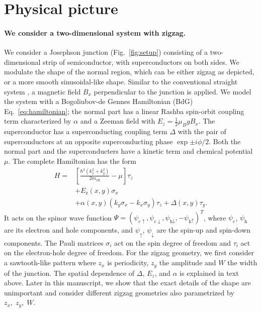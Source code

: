 \documentclass[english, twocolumn, 10pt, aps, superscriptaddress, floatfix, prb, citeautoscript]{revtex4-1}
\newcommand{\kx}{k_x}
\newcommand{\ky}{k_y}
\newcommand{\meff}{m_\text{eff}}
\renewcommand{\comment}[2]{#2}
\renewcommand{\comment}{\paragraph}
\begin{document}
\section{Physical picture}\label{sec:physical_picture}

\comment{We consider a two-dimensional system with zigzag.}
We consider a Josephson junction (Fig.~\ref{fig:setup}) consisting of a two-dimensional strip of semiconductor, with superconductors on both sides.
We modulate the shape of the normal region, which can be either zigzag as depicted, or a more smooth sinusoidal-like shape.
Similar to the conventional straight system \cite{pientka2017topological}, a magnetic field $B_x$ perpendicular to the junction is applied.
We model the system with a Bogoliubov-de Gennes Hamiltonian (BdG) Eq.~\eqref{eq:hamiltonian}; the normal part has a linear Rashba spin-orbit coupling term characterized by $\alpha$ and a Zeeman field with $E_z=\frac{1}{2} \mu_B g B_x$.
The superconductor has a superconducting coupling term $\Delta$ with the pair of superconductors at an opposite superconducting phase $\exp{\pm i \phi/2}$.
Both the normal part and the superconducters have a kinetic term and chemical potential $\mu$.
The complete Hamiltonian has the form
\begin{equation}
\begin{split}
    H = & \left[\frac{\hbar^2\left(\kx^2 + \ky^2\right)}{2\meff} - \mu\right] \tau_z \\
        & + E_\text{z}(x,y) \sigma_x \\
        & + \alpha(x,y) \left( \ky \sigma_x - \kx \sigma_y \right) \tau_z
          + \Delta(x,y) \tau_y.
\end{split}
\label{eq:hamiltonian}
\end{equation}
It acts on the spinor wave function $\Psi={\left(\psi_{e\uparrow},\psi_{e\downarrow},\psi_{\textrm{h}\downarrow},-\psi_{\textrm{h}\uparrow}\right)}^{T}$, where $\psi_e$, $\psi_\textrm{h}$ are its electron and hole components, and $\psi_\uparrow$, $\psi_\downarrow$ are the spin-up and spin-down components.
The Pauli matrices $\sigma_{i}$ act on the spin degree of freedom and $\tau_{i}$ act on the electron-hole degree of freedom.
For the zigzag geometry, we first consider a sawtooth-like pattern where $z_x$ is periodicity, $z_y$ the amplitude and $W$ the width of the junction.
The spatial dependence of $\Delta$, $E_z$, and $\alpha$ is explained in text above.
Later in this manuscript, we show that the exact details of the shape are unimportant and consider different zigzag geometries also parametrized by $z_x, \; z_y, \; W$.
\end{document}
